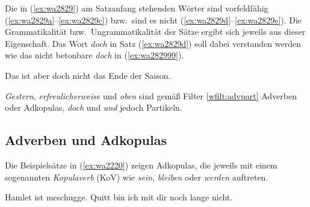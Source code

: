 
Die in (\ref{ex:wa2829}) am Satzanfang stehenden Wörter sind vorfeldfähig (\ref{ex:wa2829a}--\ref{ex:wa2829c}) bzw.\ sind es nicht (\ref{ex:wa2829d}--\ref{ex:wa2829e}).
Die Grammatikalität bzw.\ Ungrammatikalität der Sätze ergibt sich jeweils aus dieser Eigenschaft.
Das Wort \textit{doch} in Satz (\ref{ex:wa2829d}) soll dabei verstanden werden wie das nicht betonbare \textit{doch} in (\ref{ex:wa282999}).

\begin{exe}
  \ex\label{ex:wa2829}
  \begin{xlist}
  \end{xlist}
  \ex\label{ex:wa282999} Das ist aber doch nicht das Ende der Saison.
\end{exe}

\textit{Gestern}, \textit{erfreulicherweise} und \textit{oben} sind gemäß Filter \ref{wfilt:advpart} Adverben oder Adkopulas, \textit{doch} und \textit{und} jedoch Partikeln.


\subsection{Adverben und Adkopulas}

\label{sec:kopulapartikelwortklassen}


Die Beispielsätze in (\ref{ex:wa2220}) zeigen Adkopulas, die jeweils mit einem sogenannten \textit{Kopulaverb} (KoV) wie \textit{sein}, \textit{bleiben} oder \textit{werden} auftreten.

\begin{exe}
  \ex\label{ex:wa2220}
  \begin{xlist}
    \ex Hamlet ist meschugge.
    \ex Quitt bin ich mit dir noch lange nicht.
  \end{xlist}
\end{exe}

